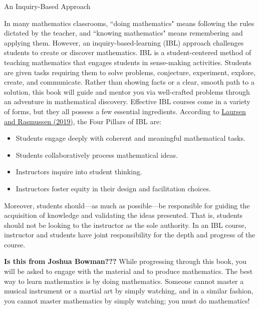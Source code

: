 \begin{section}{An Inquiry-Based Approach}

In many mathematics classrooms, ``doing mathematics" means following the rules dictated by the teacher, and ``knowing mathematics" means remembering and applying them. However, an inquiry-based-learning (IBL) approach challenges students to create or discover mathematics. IBL is a student-centered method of teaching mathematics that engages students in sense-making activities.  Students are given tasks requiring them to solve problems, conjecture, experiment, explore, create, and communicate.  Rather than showing facts or a clear, smooth path to a solution, this book will guide and mentor you via well-crafted problems through an adventure in mathematical discovery. Effective IBL courses come in a variety of forms, but they all possess a few essential ingredients. According to \href{https://www.colorado.edu/eer/sites/default/files/attached-files/laursenrasmussencommentaryauthorversion0219.pdf}{Laursen and Rasmussen (2019)}, the Four Pillars of IBL are:
\begin{itemize}
\item Students engage deeply with coherent and meaningful mathematical tasks.
\item Students collaboratively process mathematical ideas.
\item Instructors inquire into student thinking.
\item Instructors foster equity in their design and facilitation choices.
\end{itemize}

Moreover, students should---as much as possible---be responsible for guiding the acquisition of knowledge and validating the ideas presented. That is, students should not be looking to the instructor as the sole authority. In an IBL course, instructor and students have joint responsibility for the depth and progress of the course.

\textbf{Is this from Joshua Bowman???}
While progressing through this book, you will be asked to engage with the material and to produce mathematics. The best way to learn mathematics is by doing mathematics.  Someone cannot master a musical instrument or a martial art by simply watching, and in a similar fashion, you cannot master mathematics by simply watching; you must do mathematics!


\end{section}
